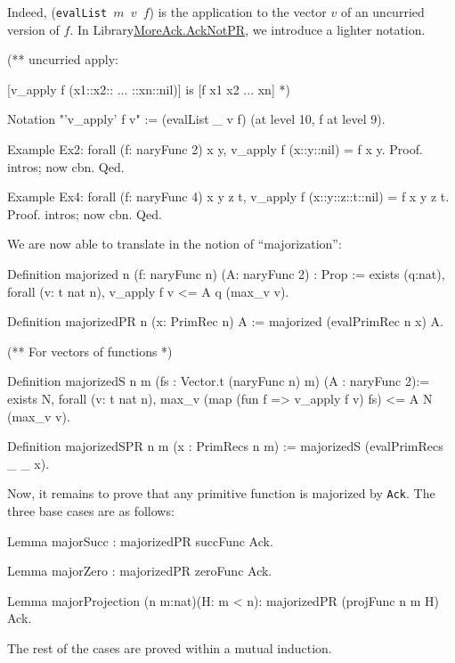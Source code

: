 Indeed, (\texttt{evalList $m$ $v$ $f$}) is the application to the vector $v$ of
an uncurried version of $f$.
In Library\href{../theories/html/hydras.MoreAck.AckNotPR.html}{MoreAck.AckNotPR}, we introduce a lighter notation.

\begin{Coqsrc}
(**  uncurried apply:
 
[v_apply f (x1::x2:: ... ::xn::nil)]  is [f x1 x2 ... xn] 
 *)

Notation "'v_apply' f v" := (evalList _ v f) 
     (at level 10, f at level 9).

Example Ex2: forall (f: naryFunc 2) x y,
    v_apply f (x::y::nil) = f x y.
Proof.   intros; now cbn. Qed.

Example Ex4: forall (f: naryFunc 4) x y z t,
    v_apply f (x::y::z::t::nil) = f x y z t.
Proof.  intros; now cbn. Qed.
\end{Coqsrc}

We are now able to translate in \gallina{} the notion of ``majorization'':

\begin{Coqsrc}
Definition majorized {n} (f: naryFunc n) (A: naryFunc 2) : Prop :=
  exists (q:nat), forall (v: t nat n),
      v_apply f v <= A q  (max_v v).

Definition majorizedPR {n} (x: PrimRec n) A := 
           majorized (evalPrimRec n x) A.

(** For vectors of functions *)

Definition majorizedS {n m} (fs : Vector.t (naryFunc n) m)
           (A : naryFunc 2):=
  exists N, forall (v: t nat n),
      max_v (map (fun f => v_apply f v) fs) <= A N (max_v v).

Definition majorizedSPR {n m} (x : PrimRecs n m) :=
  majorizedS (evalPrimRecs _ _ x).
\end{Coqsrc}

Now, it remains to prove that any primitive function is majorized by \texttt{Ack}.
The three base cases  are as follows:

\begin{Coqsrc}
Lemma majorSucc : majorizedPR  succFunc Ack.

Lemma majorZero : majorizedPR  zeroFunc Ack.

Lemma majorProjection (n m:nat)(H: m < n):
  majorizedPR (projFunc n m H) Ack.
\end{Coqsrc}


The rest of the cases are proved within a mutual  induction.

